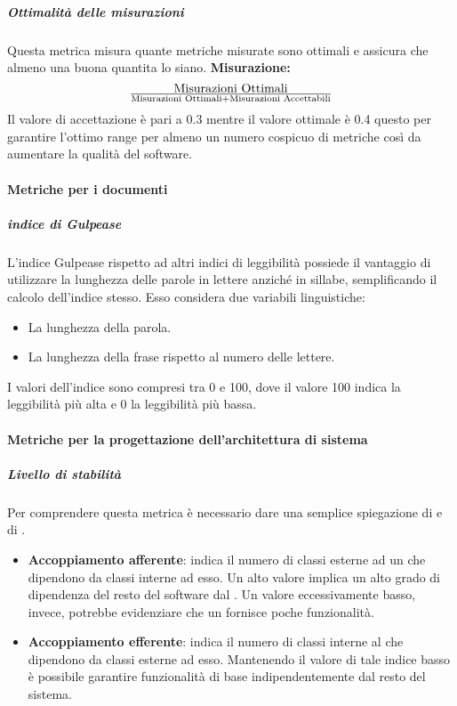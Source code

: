 \subparagraph{Ottimalità delle misurazioni}
Questa metrica misura quante metriche misurate sono ottimali e assicura che almeno una buona quantita lo siano.
\textbf{Misurazione:} 
\begin{displaymath}
{\text{Misurazioni Ottimali}}\over{\text{Misurazioni Ottimali} + \text{Misurazioni Accettabili}}
\end{displaymath} 
Il valore di accettazione è pari a 0.3 mentre il valore ottimale è 0.4 questo per garantire l'ottimo range per almeno un numero cospicuo di metriche così da aumentare la qualità del software.




\paragraph{Metriche per i documenti}
\subparagraph{indice di Gulpease}
L'indice Gulpease rispetto ad altri indici di leggibilità possiede il vantaggio di utilizzare la lunghezza delle parole in lettere anziché in sillabe, semplificando il calcolo dell'indice stesso. Esso considera due variabili linguistiche:
\begin{itemize}
\item La lunghezza della parola.
\item La lunghezza della frase rispetto al numero delle lettere.
\end{itemize}

I valori dell'indice sono compresi tra 0 e 100, dove il valore 100 indica la leggibilità più alta e 0 la leggibilità più bassa.

\paragraph{Metriche per la progettazione dell'architettura di sistema}

\subparagraph{Livello di stabilità}
Per comprendere questa metrica è necessario dare una semplice spiegazione di  e di .
\begin{itemize}
\item
\textbf{Accoppiamento afferente}: indica il numero di classi esterne ad un  che dipendono da classi interne ad esso.
Un alto valore implica un alto grado di dipendenza del resto del software dal . Un valore eccessivamente basso, invece, potrebbe evidenziare che un  fornisce poche funzionalità.
\item
\textbf{Accoppiamento efferente}: indica il numero di classi interne al  che dipendono da classi esterne ad esso.
Mantenendo il valore di tale indice basso è possibile garantire funzionalità di base indipendentemente dal resto del sistema.
\end{itemize}

